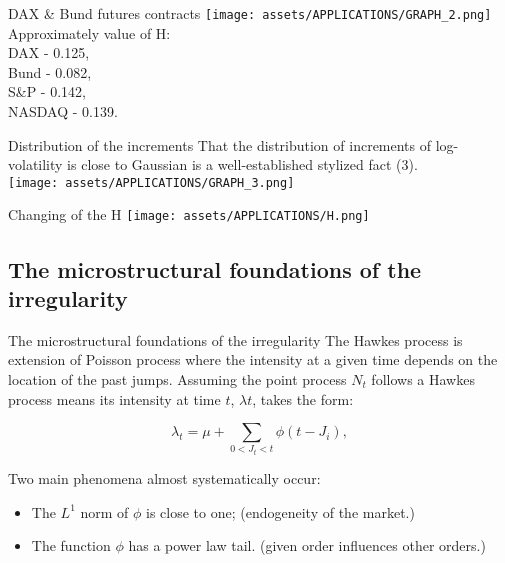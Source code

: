     \begin{frame}{DAX \& Bund futures contracts}
        \texttt{[image: assets/APPLICATIONS/GRAPH\_2.png]}\\
        Approximately value of H:\\
        \>\>\>\>\>\>\>\>\>\>\>\>DAX  - 0.125,\\
        \>\>\>\>\>\>\>\>\>\>\>\>Bund - 0.082,\\
        \>\>\>\>\>\>\>\>\>\>\>\>S\&P - 0.142,\\
        \>\>\>\>\>\>\>\>\>\>\>\>NASDAQ - 0.139.\\
    \end{frame}

    \begin{frame}{Distribution of the increments}
        That the distribution of increments of log-volatility is close to Gaussian is a well-established stylized fact (3).\\
        \texttt{[image: assets/APPLICATIONS/GRAPH\_3.png]}\\
    \end{frame}

    \begin{frame}{Changing of the H}
        \texttt{[image: assets/APPLICATIONS/H.png]}
    \end{frame}
    




\subsection{The microstructural foundations of the irregularity}
            \begin{frame}{The microstructural foundations of the irregularity}
               The Hawkes process is extension of Poisson process where the intensity at a given time depends on the 
               location of the past jumps. Assuming the point process $N_t$ follows a Hawkes process means its intensity at 
               time $t$, $\lambda t$, takes the form:

               \begin{equation*}
                \lambda_t = \mu + \sum_{0 < J_t < t} \phi (t - J_i),
               \end{equation*}

               Two main phenomena almost systematically occur:
               \begin{itemize}
                   \item The $L^1$ norm of $\phi$ is close to one; (endogeneity of the market.) 
                   \item The function $\phi$ has a power law tail. (given order influences other orders.)
               \end{itemize}
            \end{frame}
